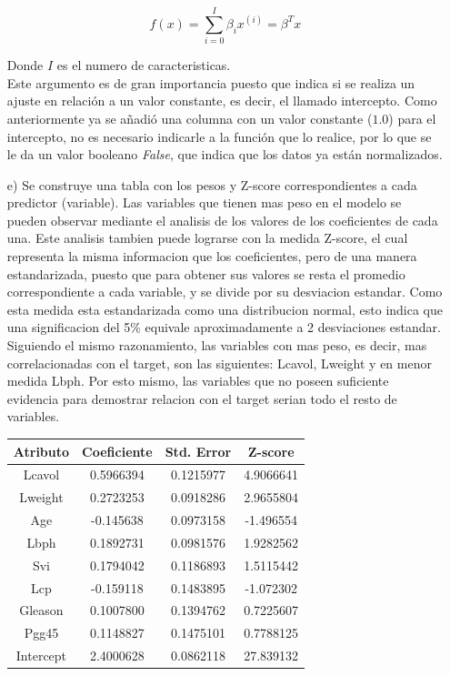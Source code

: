 \documentclass[10pt]{article}
\begin{document}
\begin{itemize}
\begin{equation}
f(x) = \sum_{i=0}^{I} \beta_i x^{(i)} = \beta^T x
\end{equation}

Donde $I$ es el numero de caracteristicas.\\

Este argumento es de gran importancia puesto que indica si se realiza un ajuste en relación a un valor constante, es decir, el llamado intercepto. Como anteriormente ya se añadió una columna con un valor constante ($1.0$) para el intercepto, no es necesario indicarle a la función que lo realice, por lo que se le da un valor booleano \textit{False}, que indica que los datos ya están normalizados. 

\item[e)]Se construye una tabla con los pesos y Z-score correspondientes a cada predictor (variable). Las variables que tienen mas peso en el modelo se pueden observar mediante el analisis de los valores de los coeficientes de cada una. Este analisis tambien puede lograrse con la medida Z-score, el cual representa la misma informacion que los coeficientes, pero de una manera estandarizada, puesto que para obtener sus valores se resta el promedio correspondiente a cada variable, y se divide por su desviacion estandar. Como esta medida esta estandarizada como una distribucion normal, esto indica que una significacion del 5\% equivale aproximadamente a 2 desviaciones estandar. Siguiendo el mismo razonamiento, las variables con mas peso, es decir, mas correlacionadas con el target, son las siguientes: Lcavol, Lweight y en menor medida Lbph. Por esto mismo, las variables que no poseen suficiente evidencia para demostrar relacion con el target serian todo el resto de variables.

\begin{table}[!htb]
  \begin{center}
    \begin{tabular}{|c|c|c|c|} \hline
    Atributo & Coeficiente & Std. Error & Z-score \\ \hline
    Lcavol &0.5966394 &0.1215977 &4.9066641 \\
 	Lweight & 0.2723253 &0.0918286& 2.9655804 \\
 	Age & -0.145638 &0.0973158 &-1.496554 \\
 	Lbph & 0.1892731 & 0.0981576& 1.9282562 \\
 	Svi & 0.1794042 & 0.1186893 &1.5115442 \\
 	Lcp & -0.159118 & 0.1483895 &-1.072302 \\
 	Gleason & 0.1007800 &0.1394762& 0.7225607 \\
 	Pgg45 & 0.1148827& 0.1475101 &0.7788125 \\
 	Intercept & 2.4000628& 0.0862118& 27.839132 \\ \hline
    \end{tabular}
  \end{center}
\end{table}



\end{itemize}
\end{document}
